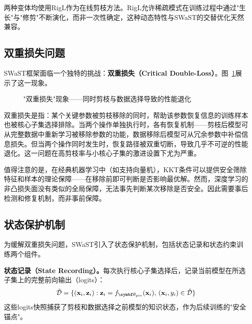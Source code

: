 两种变体均使用RigL\cite{evci2020rigging}作为在线剪枝方法。RigL允许稀疏模式在训练过程中通过"生长"与"修剪"不断演化\cite{evci2022gradient}，而非一次性确定，这种动态特性与SWaST的交替优化天然兼容。

\subsection{双重损失问题}

SWaST框架面临一个独特的挑战：\textbf{双重损失（Critical Double-Loss）}。图~\ref{fig:swast-double-loss}展示了这一现象。

\begin{figure}[htb]
  \centering
  \caption{"双重损失"现象——同时剪枝与数据选择导致的性能退化}
  \label{fig:swast-double-loss}
\end{figure}

双重损失是指：某个关键参数被剪枝移除的同时，帮助该参数恢复信息的训练样本也被核心子集选择排除。当两个操作单独执行时，各有恢复机制——剪枝后模型可从完整数据中重新学习被移除参数的功能，数据移除后模型可从冗余参数中补偿信息损失。但当两个操作同时发生时，恢复路径被双重切断，导致几乎不可逆的性能退化。这一问题在高剪枝率与小核心子集的激进设置下尤为严重。

值得注意的是，在经典机器学习中（如支持向量机），KKT条件可以提供安全筛除特征和样本的理论保障\cite{shibagaki2016simultaneous, kuhn2013nonlinear}——在移除前即可判断是否影响最优解。然而，深度学习的非凸损失面没有类似的全局保障，无法事先判断某次移除是否安全。因此需要事后检测和修复机制，而非事前保障。

\subsection{状态保护机制}

为缓解双重损失问题，SWaST引入了状态保护机制，包括状态记录和状态约束训练两个组件。

\textbf{状态记录（State Recording）。}每次执行核心子集选择后，记录当前模型在所选子集上的完整前向输出（logits）：
\begin{equation}\label{eq:swast-recording}
  \tilde{\mathcal{D}} = \lbrace(\mathbf{x}_i, \mathbf{z}_i) : \mathbf{z}_i = f_{\btheta_{\text{pre}}}(\mathbf{x}_i), \, (\mathbf{x}_i, y_i) \in \hat{\mathcal{D}}\rbrace
\end{equation}
这些logits快照捕获了剪枝和数据选择之前模型的知识状态，作为后续训练的"安全锚点"。

